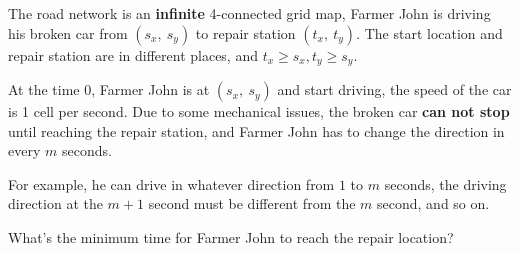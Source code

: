The road network is an \textbf{infinite} 4-connected grid map, Farmer John is driving his broken car from $(s_x,\ s_y)$ 
to repair station $(t_x,\ t_y)$. The start location and repair station are in different places,
and $t_x \ge s_x, t_y \ge s_y$.

At the time $0$, Farmer John is at $(s_x,\ s_y)$ and start driving, the speed of the car is 1 cell per second.
Due to some mechanical issues, the broken car \textbf{can not stop} until reaching the repair station, and Farmer John has to change the direction in every $m$ seconds.

For example, he can drive in whatever direction from $1$ to $m$ seconds, the driving direction at the $m+1$ second must be different from the $m$ second, and so on.

What's the minimum time for Farmer John to reach the repair location?
